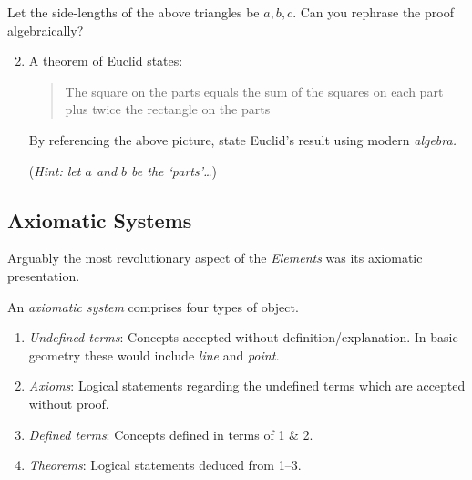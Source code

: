 \begin{exercises}{}{}
	\exstart Let the side-lengths of the above triangles be $a,b,c$. Can you rephrase the proof algebraically?
	\begin{enumerate}\setcounter{enumi}{1}
		\item A theorem of Euclid states:
		\begin{quote}
			The square on the parts equals the sum of the squares on each part plus twice the rectangle on the parts
		\end{quote}
		By referencing the above picture, state Euclid's result using modern \emph{algebra.}\par
		(\emph{Hint: let $a$ and $b$ be the `parts'\ldots})
	\end{enumerate}
\end{exercises}

\clearpage



\subsection{Axiomatic Systems}


Arguably the most revolutionary aspect of the \emph{Elements} was its axiomatic presentation.

\begin{defn}{}{}
	An \emph{axiomatic system} comprises four types of object.\vspace{-5pt}
	\begin{enumerate}\itemsep0pt
	  \item \emph{Undefined terms}: Concepts accepted without definition/explanation. In basic geometry these would include \emph{line} and \emph{point.}
	  \item \emph{Axioms}: Logical statements regarding the undefined terms which are accepted without proof.
	  \item \emph{Defined terms}: Concepts defined in terms of 1 \& 2.
	  \item \emph{Theorems}: Logical statements deduced from 1--3.
	\end{enumerate}
\end{defn}


